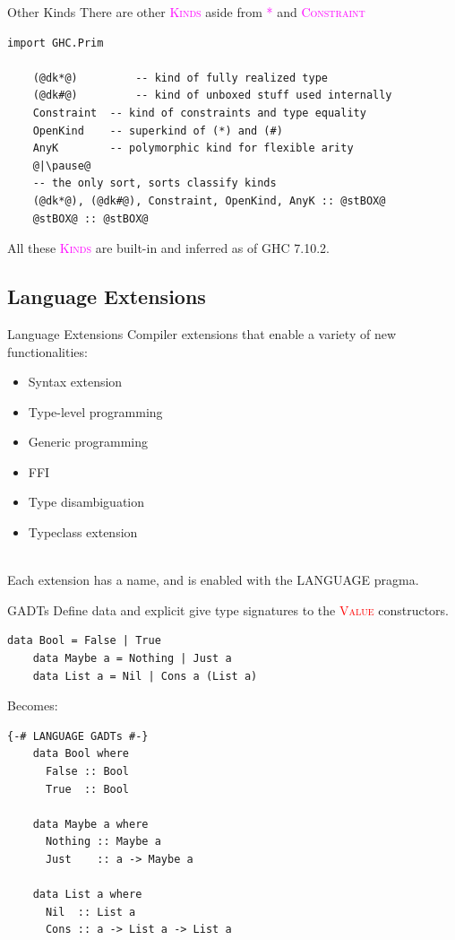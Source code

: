 \documentclass[xcolor={usenames,dvipsnames}]{beamer}
\newcommand{\hvalcon}[1]{\textcolor{Red}{\textsc{#1}}}
\newcommand{\hkind}[1]{\textcolor{Fuchsia}{\textsc{#1}}}
\begin{document}
\begin{frame}[fragile]{Other Kinds}
  There are other \hkind{Kinds} aside from \hkind{*} and \hkind{Constraint}
  \begin{lstlisting}[style=hask]
    import GHC.Prim
    
    (@dk*@)         -- kind of fully realized type
    (@dk#@)         -- kind of unboxed stuff used internally
    Constraint  -- kind of constraints and type equality
    OpenKind    -- superkind of (*) and (#)
    AnyK        -- polymorphic kind for flexible arity
    @|\pause@
    -- the only sort, sorts classify kinds
    (@dk*@), (@dk#@), Constraint, OpenKind, AnyK :: @stBOX@
    @stBOX@ :: @stBOX@
  \end{lstlisting}

  All these \hkind{Kinds} are built-in and inferred as of GHC 7.10.2.
\end{frame}


\subsection{Language Extensions}

\begin{frame}[fragile]{Language Extensions}
  Compiler extensions that enable a variety of new functionalities:
  \pause
  \begin{itemize}
    \item Syntax extension
    \item Type-level programming
    \item Generic programming
    \item FFI
    \item Type disambiguation
    \item Typeclass extension
  \end{itemize}

  \ \\
  \pause
  Each extension has a name, and is enabled with the LANGUAGE pragma.
\end{frame}

\begin{frame}[fragile]{GADTs}
  Define data and explicit give type signatures to the \hvalcon{Value} constructors.
  \begin{lstlisting}[style=hask]
    data Bool = False | True
    data Maybe a = Nothing | Just a
    data List a = Nil | Cons a (List a)
  \end{lstlisting}

  \pause
  Becomes:
  \begin{lstlisting}[style=hask]
    {-# LANGUAGE GADTs #-}
    data Bool where
      False :: Bool
      True  :: Bool

    data Maybe a where
      Nothing :: Maybe a
      Just    :: a -> Maybe a

    data List a where
      Nil  :: List a
      Cons :: a -> List a -> List a
  \end{lstlisting}
\end{frame}
\end{document}
